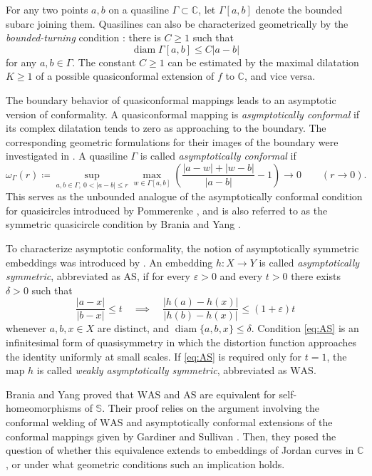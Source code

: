 \documentclass[10pt,a4paper]{amsart}
\numberwithin{equation}{section}
\newcommand{\C}{\mathbb{C}}
\newcommand{\diam}{\operatorname{diam}}
\begin{document}
For any two points $a,b$ on a quasiline $\Gamma \subset \mathbb C$, let $\Gamma[a,b]$ denote the bounded subarc joining them. 
Quasilines can also be characterized geometrically by the \emph{bounded-turning} condition \cite{Ahlfors}: there is $C\ge1$ such that
\[
 \diam\Gamma[a,b]\leq C|a-b|
\]
for any $a,b\in\Gamma$. 
The constant $C \geq 1$ can be estimated by the maximal dilatation $K \geq 1$ of a possible quasiconformal extension of $f$ to $\C$, and vice versa.

The boundary behavior of quasiconformal mappings leads to an asymptotic version of conformality.  
A quasiconformal mapping is \emph{asymptotically conformal} if its complex dilatation tends to zero as approaching to the boundary.   
The corresponding geometric formulations for their images of the boundary were investigated in \cite{Car67,GS,P}. 
A quasiline $\Gamma$ is called \emph{asymptotically conformal} if
\begin{equation} \label{def:symmetric-quasiline}
\omega_{\Gamma}(r)\coloneqq\sup_{a,b\in\Gamma,\ 0<|a-b|\leq r}\max_{w\in\Gamma[a,b]}\left(\frac{|a-w|+|w-b|}{|a-b|}-1\right)\to0\qquad(r\to0).
\end{equation}
This serves as the unbounded analogue of the asymptotically conformal condition for quasicircles introduced by Pommerenke \cite{P}, and is also referred to as the symmetric quasicircle condition by Brania and Yang \cite{BraniaYang}.

To characterize asymptotic conformality, the notion of asymptotically symmetric embeddings
was introduced by
\cite[Definition~2.1]{BraniaYang}. An embedding $h\colon X\to Y$ is called \emph{asymptotically symmetric}, abbreviated as $\mathrm{AS}$, if for every $\varepsilon>0$ and every $t>0$ there exists $\delta>0$ such that
\begin{equation}\label{eq:AS}
 \frac{|a-x|}{|b-x|}\leq t\quad\implies\quad\frac{|h(a)-h(x)|}{|h(b)-h(x)|}\le(1+\varepsilon)t
\end{equation}
whenever $a,b,x\in X$ are distinct, and
$\diam\{a,b,x\}\leq\delta$. 
Condition \eqref{eq:AS} is an infinitesimal form of quasisymmetry in which the distortion function approaches the identity uniformly at small scales. 
If \eqref{eq:AS} is required only for $t=1$, the map $h$ is called \emph{weakly asymptotically symmetric}, abbreviated as $\mathrm{WAS}$.

Brania and Yang \cite[Section~4]{BraniaYang} proved that $\mathrm{WAS}$ and $\mathrm{AS}$ are equivalent for self-homeomor\-phisms of $\mathbb S$.
Their proof relies on the argument involving the conformal welding of $\mathrm{WAS}$ and asymptotically conformal extensions of the conformal mappings given by Gardiner and Sullivan \cite[Theorem 6.3]{GS}.
Then, they posed the question of whether this equivalence extends to embeddings of Jordan curves in $\mathbb C$, or under what geometric conditions such an implication holds. 
\end{document}
